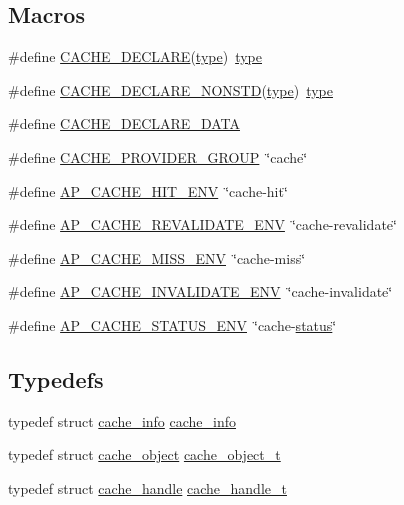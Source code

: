 \subsection*{Macros}
\begin{DoxyCompactItemize}
\item 
\#define \hyperlink{group__MOD__CACHE_gac699e640ee21daefbd5209d4c4d87f33}{C\+A\+C\+H\+E\+\_\+\+D\+E\+C\+L\+A\+RE}(\hyperlink{pcre_8txt_a2463fbbe8b0c90b90db12195e1edaa5d}{type})~\hyperlink{pcre_8txt_a2463fbbe8b0c90b90db12195e1edaa5d}{type}
\item 
\#define \hyperlink{group__MOD__CACHE_ga268b70427d9dafe11e0e261f3e27efda}{C\+A\+C\+H\+E\+\_\+\+D\+E\+C\+L\+A\+R\+E\+\_\+\+N\+O\+N\+S\+TD}(\hyperlink{pcre_8txt_a2463fbbe8b0c90b90db12195e1edaa5d}{type})~\hyperlink{pcre_8txt_a2463fbbe8b0c90b90db12195e1edaa5d}{type}
\item 
\#define \hyperlink{group__MOD__CACHE_ga664b5cafaefa085dd72cfc7e93f37ee4}{C\+A\+C\+H\+E\+\_\+\+D\+E\+C\+L\+A\+R\+E\+\_\+\+D\+A\+TA}
\item 
\#define \hyperlink{group__MOD__CACHE_ga4edcab7a404c0fb7333b982cd89c1e1b}{C\+A\+C\+H\+E\+\_\+\+P\+R\+O\+V\+I\+D\+E\+R\+\_\+\+G\+R\+O\+UP}~\char`\"{}cache\char`\"{}
\item 
\#define \hyperlink{group__MOD__CACHE_gaced03467d52ff19b8ffed147b525e1b8}{A\+P\+\_\+\+C\+A\+C\+H\+E\+\_\+\+H\+I\+T\+\_\+\+E\+NV}~\char`\"{}cache-\/hit\char`\"{}
\item 
\#define \hyperlink{group__MOD__CACHE_gae3f97648e7629ae4514b5bcb51ef05d6}{A\+P\+\_\+\+C\+A\+C\+H\+E\+\_\+\+R\+E\+V\+A\+L\+I\+D\+A\+T\+E\+\_\+\+E\+NV}~\char`\"{}cache-\/revalidate\char`\"{}
\item 
\#define \hyperlink{group__MOD__CACHE_ga60781bed209f088d47a226bad75e5ad9}{A\+P\+\_\+\+C\+A\+C\+H\+E\+\_\+\+M\+I\+S\+S\+\_\+\+E\+NV}~\char`\"{}cache-\/miss\char`\"{}
\item 
\#define \hyperlink{group__MOD__CACHE_ga3f5ed58469fff7874fb3b7eab7e6fb34}{A\+P\+\_\+\+C\+A\+C\+H\+E\+\_\+\+I\+N\+V\+A\+L\+I\+D\+A\+T\+E\+\_\+\+E\+NV}~\char`\"{}cache-\/invalidate\char`\"{}
\item 
\#define \hyperlink{group__MOD__CACHE_ga37ba50a3c25675f7abeffe5a16b1a5fe}{A\+P\+\_\+\+C\+A\+C\+H\+E\+\_\+\+S\+T\+A\+T\+U\+S\+\_\+\+E\+NV}~\char`\"{}cache-\/\hyperlink{group__apr__thread__proc_gae7daf19056dc6ab36e8f2e72e911646d}{status}\char`\"{}
\end{DoxyCompactItemize}
\subsection*{Typedefs}
\begin{DoxyCompactItemize}
\item 
typedef struct \hyperlink{structcache__info}{cache\+\_\+info} \hyperlink{group__MOD__CACHE_ga3a1d28907e2c39144e043f20ec80a9b6}{cache\+\_\+info}
\item 
typedef struct \hyperlink{structcache__object}{cache\+\_\+object} \hyperlink{group__MOD__CACHE_gaad2b9c797c4773148b3ff5e1485de21e}{cache\+\_\+object\+\_\+t}
\item 
typedef struct \hyperlink{structcache__handle}{cache\+\_\+handle} \hyperlink{group__MOD__CACHE_ga6b7854a2592838a565bdee8f94343aab}{cache\+\_\+handle\+\_\+t}
\end{DoxyCompactItemize}
